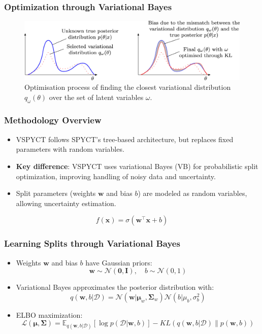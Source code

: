 \documentclass{beamer}
\begin{document}
\begin{frame}
\frametitle{Optimization through Variational Bayes}
  \begin{figure}
    \centering
    \includegraphics[width=1.0\textwidth]{images/vb_optim.jpg}
    {\tiny \caption{Optimisation process of finding the closest variational distribution $q_\omega(\theta)$ over the set of latent variables $\omega$.~\cite{}}}
    \end{figure}
\end{frame}

\begin{frame}
  \frametitle{Methodology Overview}
  \begin{itemize}
    \item VSPYCT follows SPYCT's tree-based architecture, but replaces fixed parameters with random variables.
    \item \textbf{Key difference}: VSPYCT uses variational Bayes (VB) for probabilistic split optimization, improving handling of noisy data and uncertainty.
    \item Split parameters (weights $\mathbf{w}$ and bias $b$) are modeled as random variables, allowing uncertainty estimation.
  \end{itemize}
  \[
  f(\mathbf{x}) = \sigma \left(\mathbf{w}^\top \mathbf{x} + b \right)
  \]
\end{frame}

\begin{frame}
  \frametitle{Learning Splits through Variational Bayes}
  \begin{itemize}
    \item Weights $\mathbf{w}$ and bias $b$ have Gaussian priors:
    \[
    \mathbf{w} \sim \mathcal{N}(\mathbf{0}, \mathbf{I}), \quad b \sim \mathcal{N}(0, 1)
    \]
    \item Variational Bayes approximates the posterior distribution with:
    \[
    q(\mathbf{w}, b|\mathcal{D}) = \mathcal{N}(\mathbf{w}|\boldsymbol{\mu}_w, \boldsymbol{\Sigma}_w) \mathcal{N}(b|\mu_b, \sigma_b^2)
    \]
    \item ELBO maximization: 
    \[
    \mathcal{L}(\boldsymbol{\mu}, \boldsymbol{\Sigma}) = \mathbb{E}_{q(\mathbf{w}, b|\mathcal{D})}[\log p(\mathcal{D}|\mathbf{w}, b)] - KL(q(\mathbf{w}, b|\mathcal{D}) \parallel p(\mathbf{w}, b))
    \]
  \end{itemize}
\end{frame}
\end{document}
